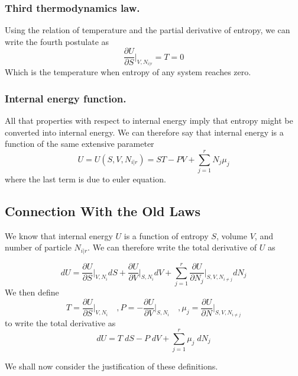 \documentclass[../../../Main.tex]{subfiles}
\begin{document}
\subsubsection{Third thermodynamics law.} Using the relation of temperature and the partial derivative of entropy, we can write the fourth postulate as 
\begin{equation*}
    \frac{\partial U}{\partial S}\bigg|_{V,N_{i|r}}=T=0
\end{equation*} 
Which is the temperature when entropy of any system reaches zero.

\subsubsection{Internal energy function.} All that properties with respect to internal energy imply that entropy might be converted into internal energy. We can therefore say that internal energy is a function of the same extensive parameter
\begin{equation*}
    U=U(S,V,N_{i|r})=ST-PV+\sum_{j=1}^{r}N_j\mu_j
\end{equation*}
where the last term is due to euler equation.

\subsection{Connection With the Old Laws}
We know that internal energy \(U\) is a function of entropy \(S \), volume \(V\), and number of particle \(N_{i|r}\). We can therefore write the total derivative of \(U\) as

\begin{equation*}
    dU=\frac{\partial U}{\partial S}\bigg|_{V,N_i} dS + \frac{ \partial U}{\partial V}\bigg|_{S,N_i} dV+ \sum_{j=1 }^{r}\frac{\partial U}{\partial N_j}\bigg|_{S,V,N_{i\neq j}}dN_j
\end{equation*} 
We then define 
\begin{equation*} 
    T=\frac{\partial U}{\partial S}\bigg|_{V, N_{i} }\quad 
    ,P=-\frac{\partial U}{\partial V}\bigg|_{S, N_{i} }\quad 
    ,\mu_j=\frac{\partial U}{\partial N}\bigg|_{S, V, N_{i\neq j} } 
\end{equation*} 
to write the total derivative as 
\begin{equation*} 
    dU=T\;dS-P\;dV+ \sum_{j=1 }^{r}\mu_j \; dN_j 
\end{equation*} 

We shall now consider the justification of these definitions.
\end{document}

